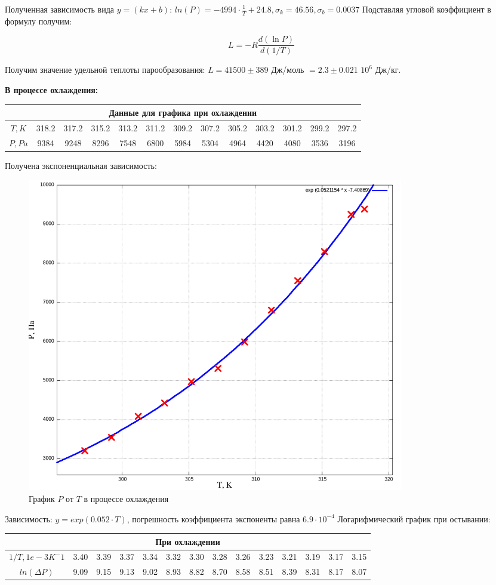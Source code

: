 \documentclass[a4paper,10pt]{article} %
\begin{document}
Полученная зависимость вида $y = (kx + b)$:
\(ln(P) = -4994\cdot \frac{1}{T} + 24.8, \sigma_k = 46.56,  \sigma_b = 0.0037\)
Подставляя угловой коэффициент в формулу получим:

$$ L = -R\frac{d(\ln P)}{d(1/T)} $$

Получим значение удельной теплоты парообразования: $L = 41500 \pm 389$ Дж/моль $= 2.3 \pm 0.021$ $10^{6}$ Дж/кг.

\medskip

\textbf{В процессе охлаждения:}


\begin{center}
\begin{tabular}{|c|c|c|c|c|c|c|c|c|c|c|c|c|}
\hline
\multicolumn{13}{|c|}{Данные для графика при охлаждении}\\
\hline
$T, K$&318.2&317.2&315.2&313.2&311.2&309.2&307.2&305.2&303.2&301.2&299.2&297.2\\\hline
$P, Pa$&9384&9248&8296&7548&6800&5984&5304&4964&4420&4080&3536&3196\\\hline
\end{tabular}
\end{center}

Получена экспоненциальная зависимость: 

\begin{figure}[H]
	\centering
	\includegraphics[width=0.8\textwidth]{2-4-1-3-res.png}
	\caption{График $P$ от $T$ в процессе охлаждения}
\end{figure}

Зависимость: $y = exp(0.052\cdot T)$, погрешность коэффициента экспоненты равна $6.9\cdot 10^{-4}$
Логарифмический график при остывании:

\begin{tabular}{|c|c|c|c|c|c|c|c|c|c|c|c|c|c|}
\hline
\multicolumn{14}{|c|}{При охлаждении}\\
\hline
$1/T, 1e-3 K^-1$&3.40&3.39&3.37&3.34&3.32&3.30&3.28&3.26&3.23&3.21&3.19&3.17&3.15\\\hline
$ln(\Delta P)$&9.09&9.15&9.13&9.02&8.93&8.82&8.70&8.58&8.51&8.39&8.31&8.17&8.07\\\hline
\end{tabular}
\end{document}
